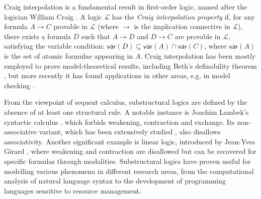 \documentclass[sn-mathphys-num]{sn-jnl}%
\newcommand{\mc}[1]{\mathcal{#1}}
\newcommand{\mf}[1]{\mathsf{#1}}
\newcommand{\vars}[1]{\mf{var} (#1)}
\theoremstyle{thmstyleone}%
\theoremstyle{thmstyletwo}%
\theoremstyle{thmstylethree}%
\begin{document}

Craig interpolation is a fundamental result in first-order logic, named after the logician William Craig \cite{craig:interpolation:1957}.
A logic $\mc{L}$ has the \emph{Craig interpolation property} if, for any formula $A \to C$ provable in $\mc{L}$ (where $\to$ is the implication connective in $\mc{L}$), there exists a formula $D$ such that $A \to D$ and $D \to C$ are provable in $\mc{L}$, satisfying the variable condition: $\vars{D} \subseteq \vars{A} \cap \vars{C}$, where $\vars{A}$ is the set of atomic formulae appearing in $A$.
Craig interpolation has been mostly employed to prove model-theoretical results, including Beth's definability theorem \cite{Beth1953}, but more recently it has found applications in other areas, e.g. in model checking \cite{Henzinger2004}.

From the viewpoint of sequent calculus, substructural logics are defined by the absence of at least one structural rule.
A notable instance is Joachim Lambek's syntactic calculus \cite{lambek:mathematics:58}, which forbids weakening, contraction and exchange.
Its non-associative variant, which has been extensively studied \cite{moot:categorial:2012}, also disallows associativity. Another significant example is linear logic, introduced by Jean-Yves Girard \cite{girard:linear:87}, where weakening and contraction are disallowed but can be recovered for specific formulas through modalities.
Substructural logics have proven useful for modelling various phenomena in different research areas, from the computational analysis of natural language syntax to the development of programming languages sensitive to resource management.
\end{document}
